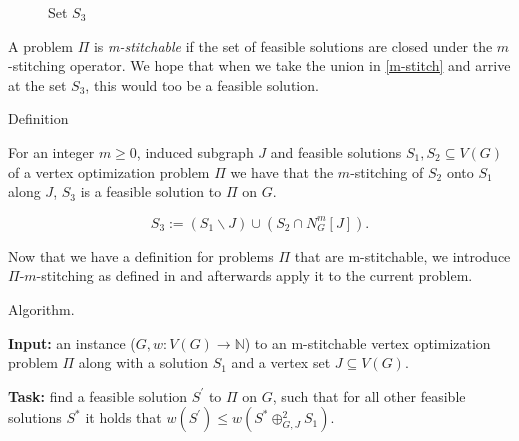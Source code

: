 \begin{figure}[H]
\begin{minipage}{0.49\textwidth}
        \caption{Set $S_3$}
        \label{fig:stitched_set}
    \end{minipage}
\end{figure}

A problem $\Pi$ is \textit{m-stitchable} if the set of feasible solutions are closed 
under the $m$-stitching operator. We hope that when we take the union in \ref{m-stitch} and arrive 
at the set $S_3$, this would too be a feasible solution.

\begin{mydefinition}[m-stitchable]{Definition}
    \label{m-stitchable}

    For an integer $m \geq 0$, induced subgraph $J$ and feasible solutions $S_1, S_2 \subseteq V(G)$ 
    of a vertex optimization problem $\Pi$ we have that the $m$-stitching of $S_2$ onto $S_1$ along 
    $J$, $S_3$ is a feasible solution to $\Pi$ on $G$.

    \[S_3 := (S_1 \backslash J) \cup (S_2 \cap N^{m}_{G} \left[J\right]).\]

\end{mydefinition}

 Now that we have a definition for problems $\Pi$ that are m-stitchable, we introduce 
$\Pi$-$m$-stitching as defined in \cite{bumpus_et_al:LIPIcs.SWAT.2024.19} and afterwards apply 
it to the current problem.

\begin{mydefinition}[$\Pi$-$m$-stitching]{Algorithm.}
    \label{alg:p-m-stitching}

    \textbf{Input:}
    an instance ($G, w : V(G) \to \mathbb{N}$) to an m-stitchable vertex optimization problem $\Pi$ 
    along with a solution $S_1$ and a vertex set $J \subseteq V(G)$.

    \textbf{Task:}
    find a feasible solution $S^{\prime}$ to $\Pi$ on $G$, such that for all other feasible solutions 
    $S^*$ it holds that $w(S^{\prime}) \leq w\left(S^{*} \oplus^{2}_{G,J} S_1\right)$.

\end{mydefinition}

